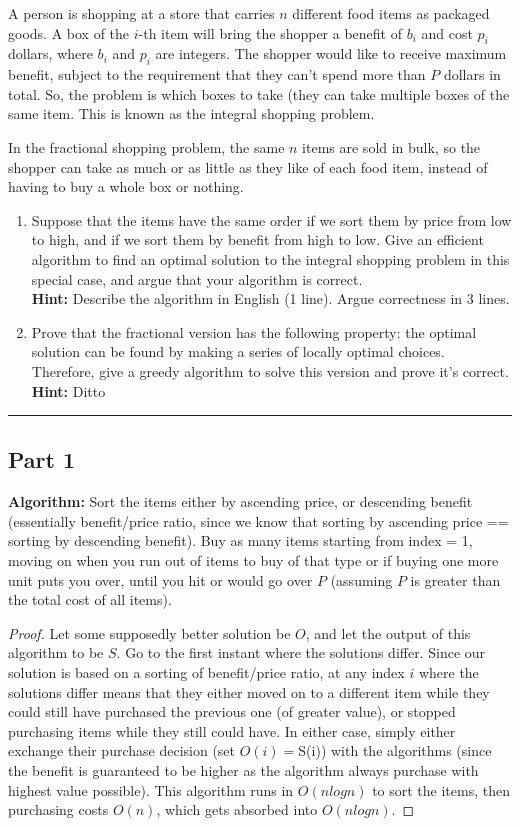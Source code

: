 \documentclass[11pt]{article}
\begin{document}
A person is shopping at a store that carries $n$ different food items as packaged goods. A box of the $i$-th item will bring the shopper a benefit of $b_i$ and cost $p_i$ dollars, where $b_i$ and $p_i$ are integers. The shopper would like to receive maximum benefit, subject to the requirement that they can't spend more than $P$ dollars in total. So, the problem is which boxes to take (they can take multiple boxes of the same item. This is known as the integral shopping problem.

In the fractional shopping problem, the same $n$ items are sold in bulk, so the shopper can take as much or as little as they like of each food item, instead of having to buy a whole box or nothing.

\begin{enumerate}
\item Suppose that the items have the same order if we sort them by price from low to high, and if we sort them by benefit from high to low. Give an efficient algorithm to find an optimal solution to the integral shopping problem in this special case, and argue that your algorithm is correct.\\
\textbf{Hint:} Describe the algorithm in English (1 line). Argue correctness in 3 lines.
\item Prove that the fractional version has the following property: the optimal solution can be found by making a series of locally optimal choices. Therefore, give a greedy algorithm to solve this version and prove it's correct.\\
\textbf{Hint:} Ditto
\end{enumerate}
\noindent\rule{17cm}{0.4pt}

\subsection*{Part 1}
\textbf{Algorithm:} Sort the items either by ascending price, or descending benefit (essentially benefit/price ratio, since we know that sorting by ascending price == sorting by descending benefit). Buy as many items starting from index = 1, moving on when you run out of items to buy of that type or if buying one more unit puts you over, until you hit or would go over $P$ (assuming $P$ is greater than the total cost of all items).
\begin{proof}
Let some supposedly better solution be $O$, and let the output of this algorithm to be $S$. Go to the first instant where the solutions differ. Since our solution is based on a sorting of benefit/price ratio, at any index $i$ where the solutions differ means that they either moved on to a different item while they could still have purchased the previous one (of greater value), or stopped purchasing items while they still could have. In either case, simply either exchange their purchase decision (set $O(i) = $S(i)) with the algorithms (since the benefit is guaranteed to be higher as the algorithm always purchase with highest value possible). This algorithm runs in $O(nlogn)$ to sort the items, then purchasing costs $O(n)$, which gets absorbed into $O(nlogn)$.
\end{proof}
\end{document}
